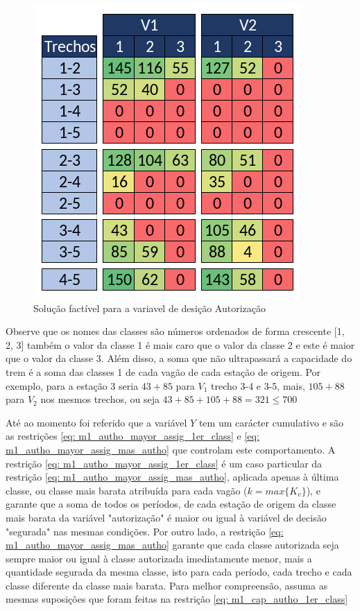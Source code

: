 \begin{figure}[!ht]
	\begin{center}
		\includegraphics[scale=0.40]{img/exemplo1.png}
		\caption{Solução factível para a variavel de desição Autorização}
		\label{fig: autorization}
	\end{center}
\end{figure}

Observe que os nomes das classes são números ordenados de forma crescente [1, 2, 3] também o valor da classe 1 é mais caro que o valor da classe 2 e este é maior que o valor da classe 3. Além disso, a soma que não ultrapassará a capacidade do trem é a soma das classes 1 de cada vagão de cada estação de origem. Por exemplo, para a estação 3 seria $43 + 85$ para $V_1$ trecho 3-4 e 3-5, mais, $105 + 88$ para $V_2$ nos mesmos trechos, ou seja $43 + 85 + 105 + 88 = 321 \leq 700$  


Até ao momento foi referido que a variável $Y$ tem um carácter cumulativo e são as restrições \ref{eq: m1_autho_mayor_assig_1er_class} e \ref{eq: m1_autho_mayor_assig_mas_autho} que controlam este comportamento. A restrição \ref{eq: m1_autho_mayor_assig_1er_class} é um caso particular da restrição \ref{eq: m1_autho_mayor_assig_mas_autho}, aplicada apenas à última classe, ou classe mais barata atribuída para cada vagão ($k=max\{K_v\}$), e garante que a soma de todos os períodos, de cada estação de origem da classe mais barata da variável "autorização" é maior ou igual à variável de decisão "segurada" nas mesmas condições. Por outro lado, a restrição \ref{eq: m1_autho_mayor_assig_mas_autho} garante que cada classe autorizada seja sempre maior ou igual à classe autorizada imediatamente menor, mais a quantidade segurada da mesma classe, isto para cada período, cada trecho e cada classe diferente da classe mais barata. Para melhor compreensão, assuma as mesmas suposições que foram feitas na restrição \ref{eq: m1_cap_autho_1er_class} %


